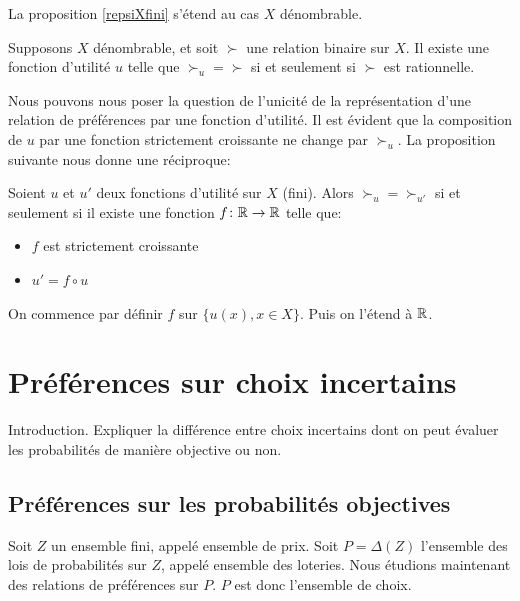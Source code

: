 La proposition \ref{repsiXfini} s'étend au cas $X$ dénombrable.

\begin{proposition}\label{repsiXdenom}
Supposons $X$ dénombrable, et soit $\succ$ une relation binaire
sur $X$. Il existe une fonction d'utilité $u$ telle que $\succ_u =
\succ$ si et seulement si $\succ$ est rationnelle.
\end{proposition}

Nous pouvons nous poser la question de l'unicité de la
représentation d'une relation de préférences par une fonction
d'utilité. Il est évident que la composition de $u$ par une
fonction strictement croissante ne change par $\succ_u$. La
proposition suivante nous donne une réciproque:

\begin{proposition}\label{unicitepreprordinale}
Soient $u$ et $u'$ deux fonctions d'utilité sur $X$ (fini). Alors
$\succ_u=\succ_{u'}$ si et seulement si il existe une fonction
$f\colon \mathbb R \to \mathbb R$ telle que:
\begin{itemize}
\item $f$ est strictement croissante%
\item $u'=f\circ u$
\end{itemize}
\end{proposition}
On commence par définir $f$ sur $\{u(x), x\in X\}$. Puis on
l'étend à $\mathbb R$.

\section{Préférences sur choix incertains}
Introduction. Expliquer la différence entre choix incertains dont
on peut évaluer les probabilités de manière objective ou non.

\subsection{Préférences sur les probabilités objectives}

Soit $Z$ un ensemble fini, appelé ensemble de prix. Soit
$P=\Delta(Z)$ l'ensemble des lois de probabilités sur $Z$, appelé
ensemble des loteries. Nous étudions maintenant des relations de
préférences sur $P$. $P$  est donc l'ensemble de choix.

